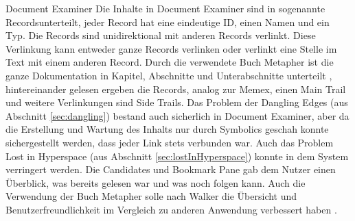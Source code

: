 \begin{section}{Document Examiner}
Die Inhalte in Document Examiner sind in sogenannte \glqq Records\grqq{ }unterteilt, jeder Record hat eine eindeutige ID, einen Namen und ein Typ. Die Records sind unidirektional mit anderen Records verlinkt. Diese Verlinkung kann entweder ganze Records verlinken oder verlinkt eine Stelle im Text mit einem anderen Record. Durch die verwendete Buch Metapher ist die ganze Dokumentation in Kapitel, Abschnitte und Unterabschnitte unterteilt \cite{Walker1987}, hintereinander gelesen ergeben die Records, analog zur Memex, einen Main Trail und weitere Verlinkungen sind Side Trails. Das Problem der Dangling Edges (aus Abschnitt \ref{sec:dangling}) bestand auch sicherlich in Document Examiner, aber da die Erstellung und Wartung des Inhalts nur durch Symbolics geschah \cite{Walker1987} konnte sichergestellt werden, dass jeder Link stets verbunden war. Auch das Problem Lost in Hyperspace (aus Abschnitt \ref{sec:lostInHyperspace}) konnte in dem System verringert werden. Die Candidates und Bookmark Pane gab dem Nutzer einen Überblick, was bereits gelesen war und was noch folgen kann. Auch die Verwendung der Buch Metapher solle nach Walker die Übersicht und Benutzerfreundlichkeit im Vergleich zu anderen Anwendung verbessert haben \cite{Walker1987}.

\end{section}

